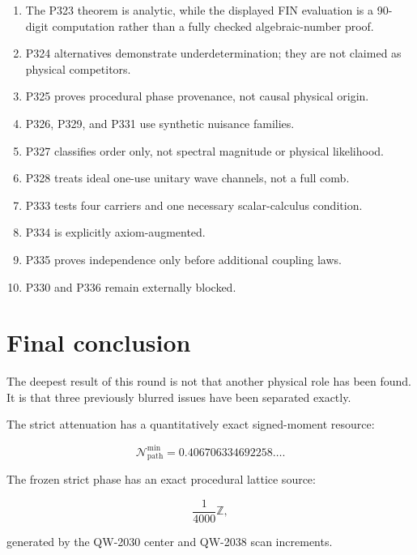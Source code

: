 \documentclass[11pt,a4paper,openany]{report}
\begin{document}
\begin{enumerate}
\item 
The P323 theorem is analytic, while the displayed FIN evaluation is a 90-digit computation rather than a fully checked algebraic-number proof.

\item 
P324 alternatives demonstrate underdetermination; they are not claimed as physical competitors.

\item 
P325 proves procedural phase provenance, not causal physical origin.

\item 
P326, P329, and P331 use synthetic nuisance families.

\item 
P327 classifies order only, not spectral magnitude or physical likelihood.

\item 
P328 treats ideal one-use unitary wave channels, not a full comb.

\item 
P333 tests four carriers and one necessary scalar-calculus condition.

\item 
P334 is explicitly axiom-augmented.

\item 
P335 proves independence only before additional coupling laws.

\item 
P330 and P336 remain externally blocked.

\end{enumerate}

\chapter{Final conclusion}

The deepest result of this round is not that another physical role has been found.  It is that three previously blurred issues have been separated exactly.

The strict attenuation has a quantitatively exact signed-moment resource:

\[
\mathcal N_{\mathrm{path}}^{\min}
=0.406706334692258\ldots.
\]

The frozen strict phase has an exact procedural lattice source:

\[
\frac1{4000}\mathbb Z,
\]

generated by the QW-2030 center and QW-2038 scan increments.
\end{document}

